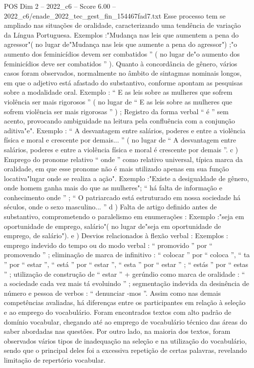 \begin{textsample}{POS Dim 2 – 2022\_c6 – Score 6.00 – 2022\_c6/enade\_2022\_tec\_gest\_fin\_154467fad7.txt}
Esse processo tem se ampliado nas situações de oralidade, caracterizando uma tendência de variação da Língua Portuguesa.
Exemplos :"Mudança nas leis que aumentem a pena do agressor"( no lugar de"Mudança nas leis que aumente a pena do agressor") ;"o aumento dos feminicídios devem ser combatidos ” ( no lugar de"o aumento dos feminicídios deve ser combatidos ” ).
Quanto à concordância de gênero, vários casos foram observados, normalmente no âmbito de sintagmas nominais longos, em que o adjetivo está afastado do substantivo, conforme apontam as pesquisas sobre a modalidade oral.
Exemplo : “ E as leis sobre as mulheres que sofrem violência ser mais rigorosos ” ( no lugar de “ E as leis sobre as mulheres que sofrem violência ser mais rigorosas ” ) ; Registro da forma verbal “ é ” sem acento, provocando ambiguidade na leitura pela confluência com a conjunção aditiva"e".
Exemplo : “ A desvantagem entre salários, poderes e entre a violência física e moral e crescente por demais... ” ( no lugar de “ A desvantagem entre salários, poderes e entre a violência física e moral é crescente por demais ”. c ) Emprego do pronome relativo “ onde ” como relativo universal, típica marca da oralidade, em que esse pronome não é mais utilizado apenas em sua função locativa"lugar onde se realiza a ação".
Exemplo :"Existe a desigualdade de gênero, onde homem ganha mais do que as mulheres"; “ há falta de informação e conhecimento onde ” ; “ O patriarcado está estruturado em nossa sociedade há séculos, onde o sexo masculino... ” d ) Falta de artigo definido antes de substantivo, comprometendo o paralelismo em enumerações : Exemplo :"seja em oportunidade de emprego, salário"( no lugar de"seja em oportunidade de emprego, de salário"). e ) Desvios relacionados à flexão verbal : Exemplos : emprego indevido do tempo ou do modo verbal : “ promovido ” por “ promovendo ” ; eliminação de marca de infinitivo : “ colocar ” por “ coloca ”, “ ta ” por “ estar ”, “ está ” por “ estar ”, “ esta ” por “ estar ” ; “ estás ” por “ estas ” ; utilização de construção de “ estar ” + gerúndio como marca de oralidade : “ a sociedade cada vez mais tá evoluindo ” ; segmentação indevida da desinência de número e pessoa de verbos : “ denunciar -mos ”.
Assim como nas demais competências avaliadas, há diferenças entre os participantes em relação à seleção e ao emprego do vocabulário.
Foram encontrados textos com alto padrão de domínio vocabular, chegando até ao emprego de vocabulário técnico das áreas do saber abordadas nas questões.
Por outro lado, na maioria dos textos, foram observados vários tipos de inadequação na seleção e na utilização do vocabulário, sendo que o principal deles foi a excessiva repetição de certas palavras, revelando limitação de repertório vocabular.

\end{textsample}
